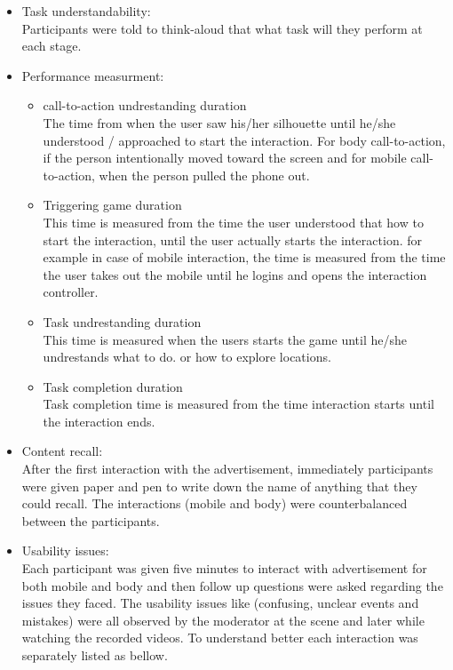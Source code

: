 \begin{itemize}

\item Task understandability: \\
Participants were told to think-aloud that what task will they perform at each stage. 


\item Performance measurment: \\

\begin{itemize}
\item call-to-action undrestanding duration \\
The time from when the user saw his/her silhouette until he/she understood / approached to start the interaction. For body call-to-action, if the person intentionally moved toward the screen and for mobile call-to-action, when the person pulled the phone out.

\item Triggering game duration\\
This time is measured from the time the user understood that how to start the interaction, until the user actually starts the interaction. for example in case of mobile interaction, the time is measured from the time the user takes out the mobile until he logins and opens the interaction controller.

\item Task undrestanding duration \\
This time is measured when the users starts the game until he/she undrestands what to do. or how to explore locations.

\item Task completion duration \\
Task completion time is measured from the time interaction starts until the interaction ends. 

\end{itemize}


\item Content recall: \\
After the first interaction with the advertisement, immediately participants were given paper and pen to write down the name of anything that they could recall. The interactions (mobile and body) were counterbalanced between the participants.


\item Usability issues: \\
Each participant was given five minutes to interact with advertisement for both mobile and body and then follow up questions were asked regarding the issues they faced.
The usability issues like (confusing, unclear events and mistakes) were all observed by the moderator at the scene and later while watching the recorded videos. To understand better each interaction was separately listed as bellow.

\end{itemize}

